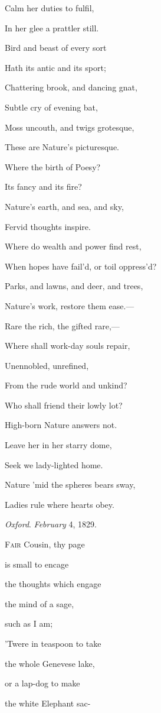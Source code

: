 Calm her duties to fulfil,

In her glee a prattler still.

Bird and beast of every sort

Hath its antic and its sport;

Chattering brook, and dancing gnat,

Subtle cry of evening bat,

Moss uncouth, and twigs grotesque,

These are Nature's picturesque.

Where the birth of Poesy?

Its fancy and its fire?

Nature's earth, and sea, and sky,

Fervid thoughts inspire.

Where do wealth and power find rest,

When hopes have fail'd, or toil oppress'd?

Parks, and lawns, and deer, and trees,

Nature's work, restore them ease.—

Rare the rich, the gifted rare,—

Where shall work-day souls repair,

Unennobled, unrefined,

From the rude world and unkind?

Who shall friend their lowly lot?

High-born Nature answers not.

Leave her in her starry dome,

Seek we lady-lighted home.

Nature 'mid the spheres bears sway,

Ladies rule where hearts obey.

\emph{Oxford}.
\emph{February} 4, 1829.


F\textsc{air} Cousin, thy page

is small to encage

the thoughts which engage

the mind of a sage,

such as
I am;

'Twere in teaspoon to take

the whole Genevese lake,

or a lap-dog to make

the white Elephant sac-

